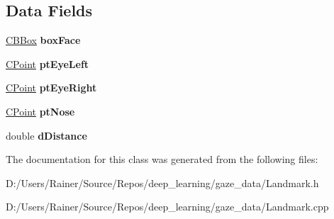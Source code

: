 \subsection*{Data Fields}
\begin{DoxyCompactItemize}
\item 
\mbox{\label{class_c_landmark_a5a820e77c5e5a2158f01ecd21efc751e}} 
\hyperlink{class_c_b_box}{C\+B\+Box} {\bfseries box\+Face}
\item 
\mbox{\label{class_c_landmark_a4af2672b6cbb2ae5ed409d23893967b9}} 
\hyperlink{class_c_point}{C\+Point} {\bfseries pt\+Eye\+Left}
\item 
\mbox{\label{class_c_landmark_a3ad9329a7cefaa517fe0f111fec76f05}} 
\hyperlink{class_c_point}{C\+Point} {\bfseries pt\+Eye\+Right}
\item 
\mbox{\label{class_c_landmark_add67bd1af83f5740f67016cd3722fde7}} 
\hyperlink{class_c_point}{C\+Point} {\bfseries pt\+Nose}
\item 
\mbox{\label{class_c_landmark_aa8dd09c2d060ddea585e38a0b5a480cf}} 
double {\bfseries d\+Distance}
\end{DoxyCompactItemize}


The documentation for this class was generated from the following files\+:\begin{DoxyCompactItemize}
\item 
D\+:/\+Users/\+Rainer/\+Source/\+Repos/deep\+\_\+learning/gaze\+\_\+data/Landmark.\+h\item 
D\+:/\+Users/\+Rainer/\+Source/\+Repos/deep\+\_\+learning/gaze\+\_\+data/Landmark.\+cpp\end{DoxyCompactItemize}
